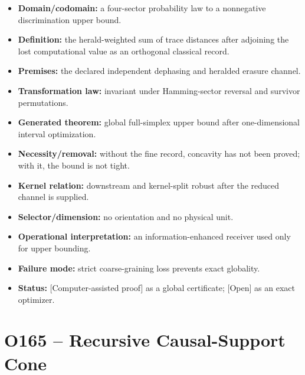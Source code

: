 \documentclass[11pt,a4paper,openany]{report}
\begin{document}
\begin{itemize}
\item 
\textbf{Domain/\allowbreak{}codomain:} a four-sector probability law to a nonnegative discrimination upper bound.

\item 
\textbf{Definition:} the herald-weighted sum of trace distances after adjoining the lost computational value as an orthogonal classical record.

\item 
\textbf{Premises:} the declared independent dephasing and heralded erasure channel.

\item 
\textbf{Transformation law:} invariant under Hamming-sector reversal and survivor permutations.

\item 
\textbf{Generated theorem:} global full-simplex upper bound after one-dimensional interval optimization.

\item 
\textbf{Necessity/\allowbreak{}removal:} without the fine record, concavity has not been proved; with it, the bound is not tight.

\item 
\textbf{Kernel relation:} downstream and kernel-split robust after the reduced channel is supplied.

\item 
\textbf{Selector/\allowbreak{}dimension:} no orientation and no physical unit.

\item 
\textbf{Operational interpretation:} an information-enhanced receiver used only for upper bounding.

\item 
\textbf{Failure mode:} strict coarse-graining loss prevents exact globality.

\item 
\textbf{Status:} \textcolor{fingreen}{[Computer-assisted proof]} as a global certificate; \textcolor{finorange}{[Open]} as an exact optimizer.

\end{itemize}

\section{O165 -- Recursive Causal-Support Cone}
\end{document}
